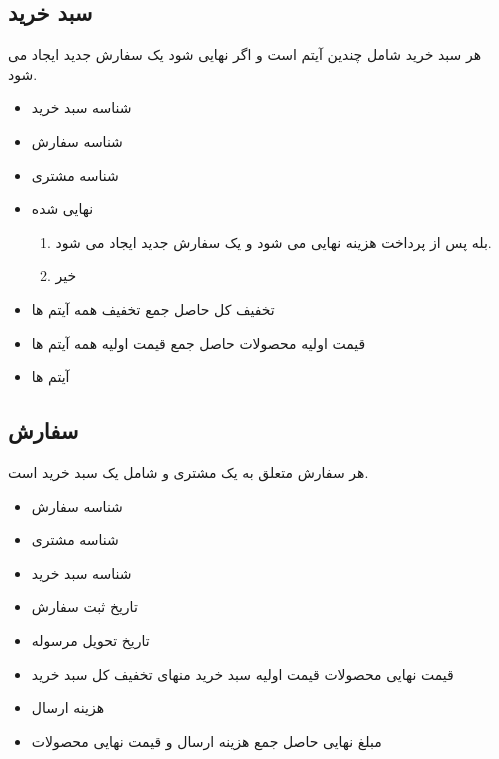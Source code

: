 \documentclass[]{article}
\begin{document}
\subsection{سبد خرید}
هر سبد خرید شامل چندین آیتم است و اگر نهایی شود یک سفارش جدید ایجاد می شود.
\begin{itemize}
\item شناسه سبد خرید
\item شناسه سفارش
\item شناسه مشتری
\item نهایی شده
\begin{enumerate}
\item بله \newline
پس از پرداخت هزینه نهایی می شود و یک سفارش جدید ایجاد می شود.
\item خیر \newline
\end{enumerate}
\item تخفیف کل
حاصل جمع تخفیف همه آیتم ها
\item قیمت اولیه محصولات
حاصل جمع قیمت اولیه همه آیتم ها
\item آیتم ها
\end{itemize}






\subsection{سفارش}
هر سفارش متعلق به یک مشتری و شامل یک سبد خرید است.
\begin{itemize}
\item شناسه سفارش
\item شناسه مشتری
\item شناسه سبد خرید
\item تاریخ ثبت سفارش
\item  تاریخ تحویل مرسوله

\item قیمت نهایی محصولات
قیمت اولیه سبد خرید منهای تخفیف کل سبد خرید 
\item هزینه ارسال 
\item مبلغ نهایی \newline
حاصل جمع هزینه ارسال و قیمت نهایی محصولات
\end{itemize}
\end{document}
